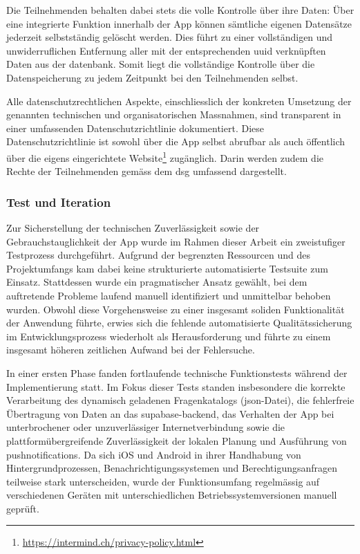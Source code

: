 Die Teilnehmenden behalten dabei stets die volle Kontrolle über ihre Daten: Über eine integrierte Funktion innerhalb der App können sämtliche eigenen Datensätze jederzeit selbstständig gelöscht werden. Dies führt zu einer vollständigen und unwiderruflichen Entfernung aller mit der entsprechenden \gls{uuid} verknüpften Daten aus der \gls{datenbank}. Somit liegt die vollständige Kontrolle über die Datenspeicherung zu jedem Zeitpunkt bei den Teilnehmenden selbst.

Alle datenschutzrechtlichen Aspekte, einschliesslich der konkreten Umsetzung der genannten technischen und organisatorischen Massnahmen, sind transparent in einer umfassenden Datenschutzrichtlinie dokumentiert. Diese Datenschutzrichtlinie ist sowohl über die App selbst abrufbar als auch öffentlich über die eigens eingerichtete Website\footnote{\href{https://intermind.ch/privacy-policy.html}{https://intermind.ch/privacy-policy.html}} zugänglich. Darin werden zudem die Rechte der Teilnehmenden gemäss dem \gls{dsg} umfassend dargestellt.

\subsubsection{Test und Iteration}
Zur Sicherstellung der technischen Zuverlässigkeit sowie der Gebrauchstauglichkeit der App wurde im Rahmen dieser Arbeit ein zweistufiger Testprozess durchgeführt. Aufgrund der begrenzten Ressourcen und des Projektumfangs kam dabei keine strukturierte automatisierte Testsuite zum Einsatz. Stattdessen wurde ein pragmatischer Ansatz gewählt, bei dem auftretende Probleme laufend manuell identifiziert und unmittelbar behoben wurden. Obwohl diese Vorgehensweise zu einer insgesamt soliden Funktionalität der Anwendung führte, erwies sich die fehlende automatisierte Qualitätssicherung im Entwicklungsprozess wiederholt als Herausforderung und führte zu einem insgesamt höheren zeitlichen Aufwand bei der Fehlersuche.

In einer ersten Phase fanden fortlaufende technische Funktionstests während der Implementierung statt. Im Fokus dieser Tests standen insbesondere die korrekte Verarbeitung des dynamisch geladenen Fragenkatalogs (\gls{json}-Datei), die fehlerfreie Übertragung von Daten an das \gls{supabase}-\gls{backend}, das Verhalten der App bei unterbrochener oder unzuverlässiger Internetverbindung sowie die plattformübergreifende Zuverlässigkeit der lokalen Planung und Ausführung von \glspl{pushnotification}. Da sich iOS und Android in ihrer Handhabung von Hintergrundprozessen, Benachrichtigungssystemen und Berechtigungsanfragen teilweise stark unterscheiden, wurde der Funktionsumfang regelmässig auf verschiedenen Geräten mit unterschiedlichen Betriebssystemversionen manuell geprüft.

